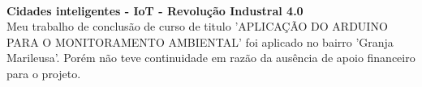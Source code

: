 \documentclass[12pt,a4paper,oneside,sumario=tradicional,brazil]{abntex2}
\begin{document}
	\
	
	\indent
	\textbf{{\large Cidades inteligentes - IoT - Revolução Industral 4.0}} \\
	\indent
	Meu trabalho de conclusão de curso de titulo 'APLICAÇÃO DO ARDUINO PARA O MONITORAMENTO AMBIENTAL' foi aplicado no bairro 'Granja Marileusa'. Porém não teve continuidade em razão da ausência de apoio financeiro para o projeto. \\
	\indent

	\
	
	
\end{document}
